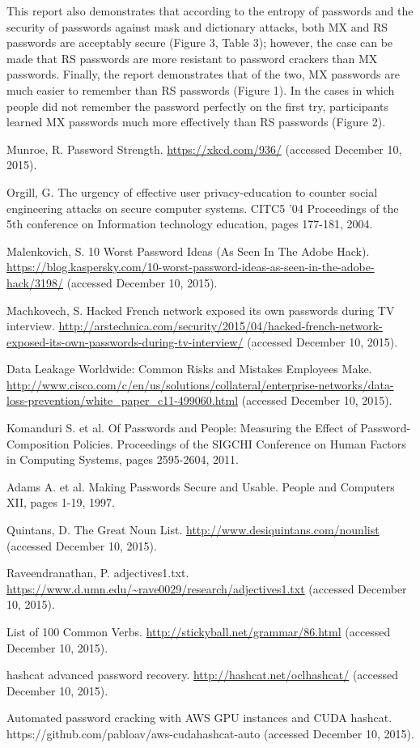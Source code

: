 \documentclass{article}
\begin{document}
This report also demonstrates that according to the entropy of passwords and the security of passwords against mask and dictionary attacks, both MX and RS passwords are acceptably secure (Figure 3, Table 3); however, the case can be made that RS passwords are more resistant to password crackers than MX passwords. Finally, the report demonstrates that of the two, MX passwords are much easier to remember than RS passwords (Figure 1). In the cases in which people did not remember the password perfectly on the first try, participants learned MX passwords much more effectively than RS passwords (Figure 2).

\begin{thebibliography}{9}
Munroe, R. Password Strength. \url{https://xkcd.com/936/} (accessed December 10, 2015). 

Orgill, G. The urgency of effective user privacy-education to counter social engineering attacks on secure computer systems. CITC5 '04 Proceedings of the 5th conference on Information technology education, pages 177-181, 2004. 

Malenkovich, S. 10 Worst Password Ideas (As Seen In The Adobe Hack). \url{https://blog.kaspersky.com/10-worst-password-ideas-as-seen-in-the-adobe-hack/3198/} (accessed December 10, 2015).

Machkovech, S. Hacked French network exposed its own passwords during TV interview. \url{http://arstechnica.com/security/2015/04/hacked-french-network-exposed-its-own-passwords-during-tv-interview/} (accessed December 10, 2015).

Data Leakage Worldwide: Common Risks and Mistakes Employees Make. \url{http://www.cisco.com/c/en/us/solutions/collateral/enterprise-networks/data-loss-prevention/white_paper_c11-499060.html} (accessed December 10, 2015).

Komanduri S. et al. Of Passwords and People: Measuring the Effect of Password-Composition Policies. Proceedings of the SIGCHI Conference on Human Factors in Computing Systems, pages 2595-2604, 2011.  

Adams A. et al. Making Passwords Secure and Usable. People and Computers XII, pages 1-19, 1997.

Quintans, D. The Great Noun List. \url{http://www.desiquintans.com/nounlist} (accessed December 10, 2015).

Raveendranathan, P. adjectives1.txt. \url{https://www.d.umn.edu/~rave0029/research/adjectives1.txt} (accessed December 10, 2015).

List of 100 Common Verbs. \url{http://stickyball.net/grammar/86.html} (accessed December 10, 2015).

hashcat advanced password recovery. \url{http://hashcat.net/oclhashcat/} (accessed December 10, 2015).

Automated password cracking with AWS GPU instances and CUDA hashcat. https://github.com/pabloav/aws-cudahashcat-auto (accessed December 10, 2015).

\end{thebibliography}
\end{document}
